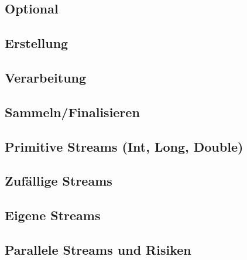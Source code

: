 
\subsection{Optional}

\subsection{Erstellung}

\subsection{Verarbeitung}

\subsection{Sammeln/Finalisieren}

\subsection{Primitive Streams (Int, Long, Double)}

\subsection{Zufällige Streams}

\subsection{Eigene Streams}

\subsection{Parallele Streams und Risiken}
